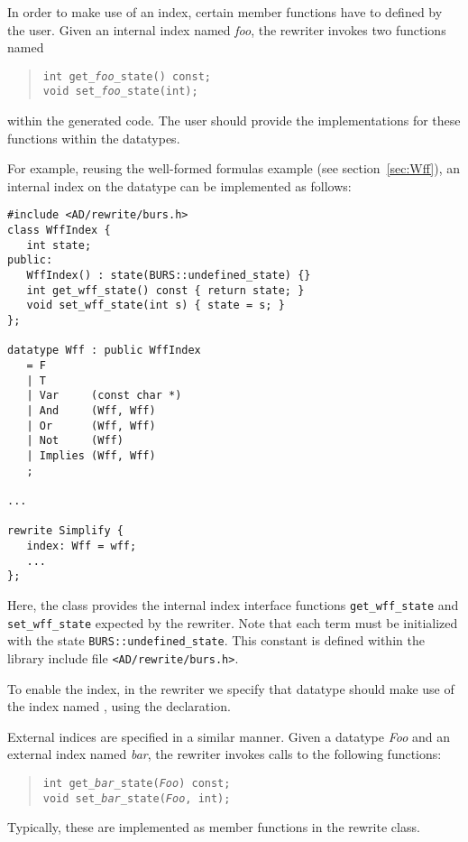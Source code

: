 
In order to make use of an index, certain member functions have to defined
by the user.  Given an internal index named {\em foo}, the rewriter
invokes two functions named
\begin{quotation}
\noindent
   {\tt int get\_{\em foo}\_state() const; } \\
   {\tt void set\_{\em foo}\_state(int); }
\end{quotation}
\noindent within the generated code.  The user should provide the 
implementations for these functions within the datatypes.  

For example, reusing the well-formed formulas example (see 
section~\ref{sec:Wff}),
an internal index on the datatype  can be implemented as follows:
\begin{verbatim}
#include <AD/rewrite/burs.h>
class WffIndex {
   int state;
public:
   WffIndex() : state(BURS::undefined_state) {}
   int get_wff_state() const { return state; }
   void set_wff_state(int s) { state = s; }
};

datatype Wff : public WffIndex
   = F
   | T
   | Var     (const char *)
   | And     (Wff, Wff)
   | Or      (Wff, Wff)
   | Not     (Wff)
   | Implies (Wff, Wff)
   ;

...

rewrite Simplify {
   index: Wff = wff;
   ...
};
\end{verbatim}

Here, the class  provides the internal index interface
functions \verb|get_wff_state| and \verb|set_wff_state| expected by
the rewriter.  Note that each term must be initialized with the
state \verb|BURS::undefined_state|.  This constant is defined within
the library include file \verb|<AD/rewrite/burs.h>|.

To enable the index, in the rewriter 
we specify that datatype  should make use of the index named ,
using the  declaration.  


External indices are specified in a similar manner.  Given a datatype
{\em Foo} and an external index named {\em bar}, the rewriter invokes
calls to the following functions:
\begin{quotation}
\noindent
   {\tt int get\_{\em bar}\_state({\em Foo}) const; } \\
   {\tt void set\_{\em bar}\_state({\em Foo}, int); }
\end{quotation}
Typically, these are implemented as member functions in the rewrite class.

